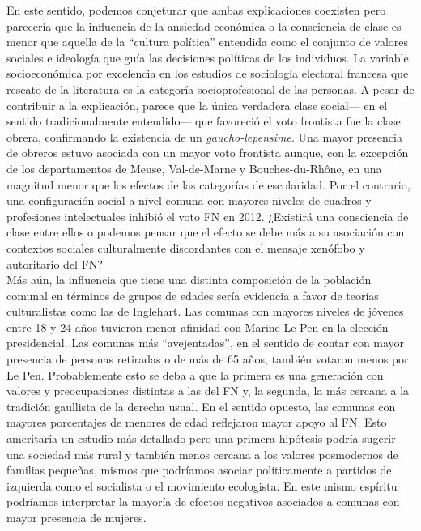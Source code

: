 En este sentido, podemos conjeturar que ambas explicaciones coexisten pero parecería que la influencia de la ansiedad económica o la consciencia de clase es menor que aquella de la ``cultura política'' entendida como el conjunto de valores sociales e ideología que guía las decisiones políticas de los individuos. La variable socioeconómica por excelencia en los estudios de sociología electoral francesa que rescato de la literatura es la categoría socioprofesional de las personas. A pesar de contribuir a la explicación, parece que la única verdadera clase social--- en el sentido tradicionalmente entendido--- que favoreció el voto frontista fue la clase obrera, confirmando la existencia de un \textit{gaucho-lepensime}. Una mayor presencia de obreros estuvo asociada con un mayor voto frontista aunque, con la excepción de los departamentos de Meuse, Val-de-Marne y Bouches-du-Rhône, en una magnitud menor que los efectos de las categorías de escolaridad. Por el contrario, una configuración social a nivel comuna con mayores niveles de cuadros y profesiones intelectuales inhibió el voto FN en 2012. ¿Existirá una consciencia de clase entre ellos o podemos pensar que el efecto se debe más a su asociación con contextos sociales culturalmente discordantes con el mensaje xenófobo y autoritario del FN?\\ 

Más aún, la influencia que tiene una distinta composición de la población comunal en términos de grupos de edades sería evidencia a favor de teorías culturalistas como las de Inglehart. Las comunas con mayores niveles de jóvenes entre 18 y 24 años tuvieron menor afinidad con Marine Le Pen en la elección presidencial. Las comunas más ``avejentadas'', en el sentido de contar con mayor presencia de personas retiradas o de más de 65 años, también votaron menos por Le Pen. Probablemente esto se deba a que la primera es una generación con valores y preocupaciones distintas a las del FN y, la segunda, la más cercana a la tradición gaullista de la derecha usual. En el sentido opuesto, las comunas con mayores porcentajes de menores de edad reflejaron mayor apoyo al FN. Esto ameritaría un estudio más detallado pero una primera hipótesis podría sugerir una sociedad más rural y también menos cercana a los valores posmodernos de familias pequeñas, mismos que podríamos asociar políticamente a partidos de izquierda como el socialista o el movimiento ecologista. En este mismo espíritu podríamos interpretar la mayoría de efectos negativos asociados a comunas con mayor presencia de mujeres.\\

